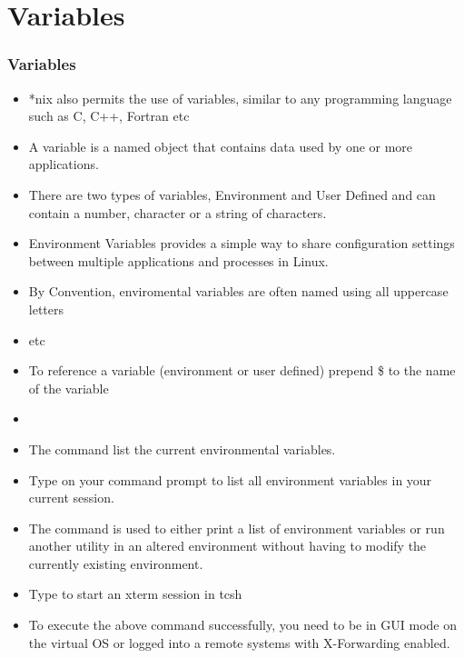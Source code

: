 \documentclass[10pt,t]{beamer}
\begin{document}
\section{Variables}
\begin{frame}
  \frametitle{Variables}
  \begin{itemize}
    \item *nix also permits the use of variables, similar to any programming language such as C, C++, Fortran etc
    \item A variable is a named object that contains data used by one or more applications. 
    \item There are two types of variables, Environment and User Defined and can contain  a number, character or a string of characters.
    \item Environment Variables provides a simple way to share configuration settings between multiple applications and processes in Linux.
    \item By Convention, enviromental variables are often named using all uppercase letters
    \item[e.g.]  etc
    \item To reference a variable (environment or user defined) prepend \$ to the name of the variable
    \item[e.g.] 
    \framebreak
  \end{itemize}
%
  \begin{itemize}
    \item The command  list the current environmental variables.
    \item[$\mybigstar$] {Type  on your command prompt to list all environment variables in your current session.}
    \item The command  is used to either print a list of environment variables or run another utility in an altered environment without having to modify the currently existing environment.
    \item[$\mybigstar$] {Type  to start an xterm session in tcsh}
    \item[$\vardiamond$] {To execute the above command successfully, you need to be in GUI mode on the virtual OS or logged into a remote systems with X-Forwarding enabled.}

\end{itemize}
\end{frame}
\end{document}
